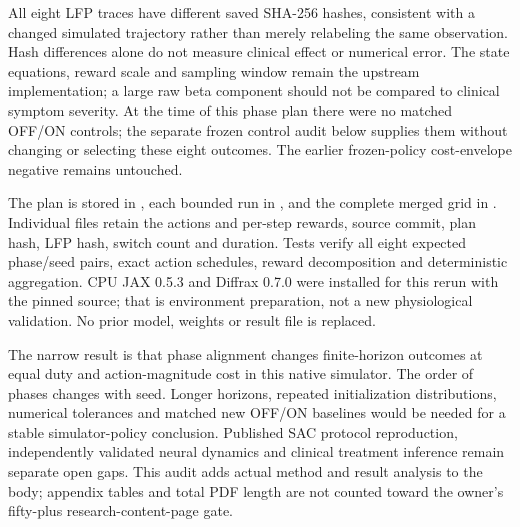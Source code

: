 All eight LFP traces have different saved SHA-256 hashes, consistent with a changed simulated trajectory rather than merely relabeling the same observation. Hash differences alone do not measure clinical effect or numerical error. The state equations, reward scale and sampling window remain the upstream implementation; a large raw beta component should not be compared to clinical symptom severity. At the time of this phase plan there were no matched OFF/ON controls; the separate frozen control audit below supplies them without changing or selecting these eight outcomes. The earlier frozen-policy cost-envelope negative remains untouched.

The plan is stored in , each bounded run in , and the complete merged grid in . Individual files retain the actions and per-step rewards, source commit, plan hash, LFP hash, switch count and duration. Tests verify all eight expected phase/seed pairs, exact action schedules, reward decomposition and deterministic aggregation. CPU JAX 0.5.3 and Diffrax 0.7.0 were installed for this rerun with the pinned source; that is environment preparation, not a new physiological validation. No prior model, weights or result file is replaced.

The narrow result is that phase alignment changes finite-horizon outcomes at equal duty and action-magnitude cost in this native simulator. The order of phases changes with seed. Longer horizons, repeated initialization distributions, numerical tolerances and matched new OFF/ON baselines would be needed for a stable simulator-policy conclusion. Published SAC protocol reproduction, independently validated neural dynamics and clinical treatment inference remain separate open gaps. This audit adds actual method and result analysis to the body; appendix tables and total PDF length are not counted toward the owner's fifty-plus research-content-page gate.

